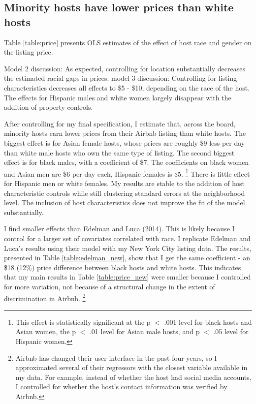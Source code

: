 \subsection*{Minority hosts have lower prices than white hosts} 
	\label{result1}

Table \ref{table:price} presents OLS estimates of the effect of host race and gender on the listing price. 

Model 2 discussion: As expected, controlling for location substantially decreases the estimated racial gaps in prices. 
model 3 discussion: Controlling for listing characteristics decreases all effects to \$5 - \$10, depending on the race of the host. The effects for Hispanic males and white women largely disappear with the addition of property controls.

After controlling for my final specification, I estimate that, across the board, minority hosts earn lower prices from their Airbnb listing than white hosts. The biggest effect is for Asian female hosts, whose prices are roughly \$9 less per day than white male hosts who own the same type of listing. The second biggest effect is for black males, with a coefficient of \$7. The coefficients on black women and Asian men are \$6 per day each, Hispanic females is \$5.%
	\footnote{This effect is statistically significant at the p $<$ .001 level for black hosts and Asian women, the p $<$ .01 level for Asian male hosts, and p $<$ .05 level for Hispanic women.}  
There is little effect for Hispanic men or white females. My results are stable to the addition of host characteristic controls while still clustering standard errors at the neighborhood level. The inclusion of host characteristics does not improve the fit of the model substantially.  

I find smaller effects than Edelman and Luca (2014). This is likely because I control for a larger set of covariates correlated with race. I replicate Edelman and Luca's results using their model with my New York City listing data. The results, presented in Table \ref{table:edelman_new}, show that I get the same coefficient - an \$18 (12\%) price difference between black hosts and white hosts. This indicates that my main results in Table \ref{table:price_new} were smaller because I controlled for more variation, not because of a structural change in the extent of discrimination in Airbnb.%
	\footnote{Airbnb has changed their user interface in the past four years, so I approximated several of their regressors with the closest variable available in my data. For example, instead of whether the host had social media accounts, I controlled for whether the host's contact information was verified by Airbnb.}


